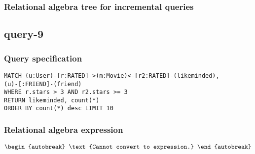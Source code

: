 \subsubsection*{Relational algebra tree for incremental queries}

\subsection{query-9}

\subsubsection*{Query specification}

\begin{lstlisting}
MATCH (u:User)-[r:RATED]->(m:Movie)<-[r2:RATED]-(likeminded),
(u)-[:FRIEND]-(friend)
WHERE r.stars > 3 AND r2.stars >= 3
RETURN likeminded, count(*)
ORDER BY count(*) desc LIMIT 10
\end{lstlisting}

\subsubsection*{Relational algebra expression}

\begin{align*}
\begin{autobreak}
\text{Cannot convert to expression.}
\end{autobreak}
\end{align*}

